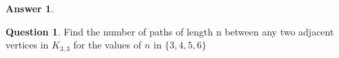 \documentclass[article, 12pt]{article}
\theoremstyle{definition}
\newtheorem{question}{Question}
\newtheorem{answer}{Answer}
\begin{document}
    \begin{answer}
        \begin{figure}[H]
            \centering
        \end{figure}
    \end{answer}
    \begin{question}
        Find the number of paths of length n between any two adjacent vertices in $K_{3,3}$ for the values of $n$ in $\{3, 4, 5, 6\}$
    \end{question}
\end{document}
